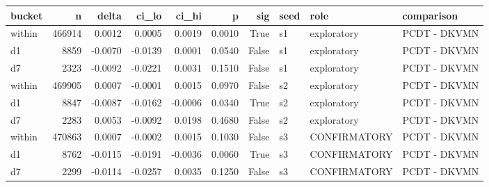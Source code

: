 \begin{tabular}{lrrrrrrlll}
\toprule
bucket & n & delta & ci\_lo & ci\_hi & p & sig & seed & role & comparison \\
\midrule
within & 466914 & 0.0012 & 0.0005 & 0.0019 & 0.0010 & True & s1 & exploratory & PCDT - DKVMN \\
d1 & 8859 & -0.0070 & -0.0139 & 0.0001 & 0.0540 & False & s1 & exploratory & PCDT - DKVMN \\
d7 & 2323 & -0.0092 & -0.0221 & 0.0031 & 0.1510 & False & s1 & exploratory & PCDT - DKVMN \\
within & 469905 & 0.0007 & -0.0001 & 0.0015 & 0.0970 & False & s2 & exploratory & PCDT - DKVMN \\
d1 & 8847 & -0.0087 & -0.0162 & -0.0006 & 0.0340 & True & s2 & exploratory & PCDT - DKVMN \\
d7 & 2283 & 0.0053 & -0.0092 & 0.0198 & 0.4680 & False & s2 & exploratory & PCDT - DKVMN \\
within & 470863 & 0.0007 & -0.0002 & 0.0015 & 0.1030 & False & s3 & CONFIRMATORY & PCDT - DKVMN \\
d1 & 8762 & -0.0115 & -0.0191 & -0.0036 & 0.0060 & True & s3 & CONFIRMATORY & PCDT - DKVMN \\
d7 & 2299 & -0.0114 & -0.0257 & 0.0035 & 0.1250 & False & s3 & CONFIRMATORY & PCDT - DKVMN \\
\bottomrule
\end{tabular}
